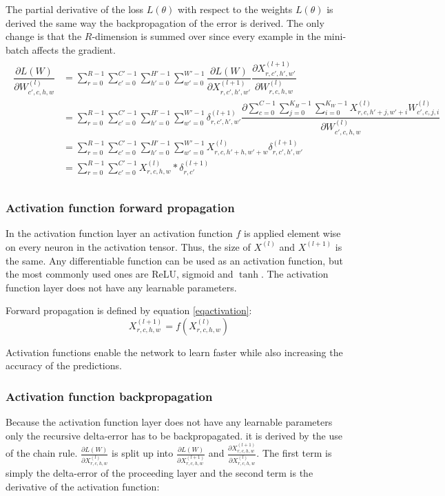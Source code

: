 \documentclass[a4paper,11pt,twoside]{article}
\newcommand*{\pd}[2]{\ensuremath{\dfrac{\partial #1}{\partial #2}}}
\newcommand*{\inpd}[2]{\ensuremath{\frac{\partial #1}{\partial #2}}}
\begin{document}
The partial derivative of the loss $L(\theta)$ with respect to the weights $L(\theta)$ is derived the same way the backpropagation of the error is derived. The only change is that the $R$-dimension is summed over since every example in the mini-batch affects the gradient. \cite{cs231n} \cite{webconv1} \cite{webconv2} \cite{webconv3} 
\begin{align}
\begin{split}
	\pd{L(W)}{W^{(l)}_{c',c,h,w}}
		& = \sum^{R-1}_{r=0} \sum^{C'-1}_{c'=0} \sum^{H'-1}_{h'=0} \sum^{W'-1}_{w'=0} \pd{L(W)}{X^{(l+1)}_{r,c',h',w'}} \pd{X^{(l+1)}_{r,c',h',w'}}{W^{(l)}_{r,c,h,w}} \\
		& = \sum^{R-1}_{r=0} \sum_{c'=0}^{C'-1} \sum^{H'-1}_{h'=0} \sum^{W'-1}_{w'=0} \delta^{(l+1)}_{r,c',h',w'} \pd{\sum\limits^{C-1}_{c=0} \sum\limits^{K_H-1}_{j=0} \sum\limits^{K_W-1}_{i=0} X^{(l)}_{r, c, h'+j, w'+i}W^{(l)}_{c', c, j, i}}{W^{(l)}_{c',c,h,w}} \\
		& = \sum^{R-1}_{r=0} \sum^{C'-1}_{c'=0} \sum^{H'-1}_{h'=0} \sum^{W'-1}_{w'=0} X^{(l)}_{r, c, h'+h, w'+w} \delta^{(l+1)}_{r,c',h',w'} \\
		& = \sum^{R-1}_{r=0} \sum^{C'-1}_{c'=0} X^{(l)}_{r, c, h, w} * \delta^{(l+1)}_{r,c'} \\
\end{split}
\end{align}

\subsubsection{Activation function forward propagation}
In the activation function layer an activation function $f$ is applied element wise on every neuron in the activation tensor. Thus, the size of $X^{(l)}$ and $X^{(l+1)}$ is the same. Any differentiable function can be used as an activation function, but the most commonly used ones are ReLU, sigmoid and $\tanh$. The activation function layer does not have any learnable parameters. \cite{convmath}
 
Forward propagation is defined by equation \eqref{eqactivation}:
\begin{equation}\label{eqactivation}
X^{(l+1)}_{r,c,h,w} = f(X^{(l)}_{r,c,h,w})
\end{equation}

Activation functions enable the network to learn faster while also increasing the accuracy of the predictions. \cite{cs231n}

\subsubsection{Activation function backpropagation}
Because the activation function layer does not have any learnable parameters only the recursive delta-error has to be backpropagated. it is derived by the use of the chain rule. $\inpd{L(W)}{X^{(l)}_{r,c,h,w}}$ is split up into $\inpd{L(W)}{X^{(l+1)}_{r,c,h,w}}$ and $\inpd{X^{(l+1)}_{r,c,h,w}}{X^{(l)}_{r,c,h,w}}$. The first term is simply the delta-error of the proceeding layer and the second term is the derivative of the activation function: \cite{cs231n} \cite{convmath}
\end{document}
